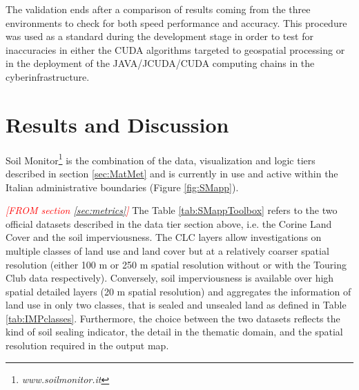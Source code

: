\documentclass[APA,LATO1COL,doublespace]{WileyNJD-v2}
\newcommand{\toberevised}[1]{\emph{\textcolor{red}{#1}}} %
\begin{document}
The validation ends after a comparison of results coming from the three environments to check for both speed performance and accuracy. 
This procedure was used as a standard during the development stage in order to test for inaccuracies in either the CUDA algorithms targeted to geospatial processing or in the deployment of the JAVA/JCUDA/CUDA computing chains in the cyberinfrastructure.

\section{ Results and Discussion } %
\label{sec:results}
Soil Monitor\footnote{\emph{www.soilmonitor.it}} is the combination of the data, visualization and logic tiers described in section \ref{sec:MatMet} and is currently in use and active within the Italian administrative boundaries (Figure \ref{fig:SMapp}).

\toberevised{[FROM section \ref{sec:metrics}]}
The Table \ref{tab:SMappToolbox} refers to the two official datasets described in the data tier section above, i.e. the Corine Land Cover and the soil imperviousness. 
The CLC layers allow investigations on multiple classes of land use and land cover but at a relatively coarser spatial resolution (either 100 m or 250 m spatial resolution without or with the Touring Club data respectively).
Conversely, soil imperviousness is available over high spatial detailed layers (20 m spatial resolution) and aggregates the information of land use in only two classes, that is sealed and unsealed land as defined in Table \ref{tab:IMPclasses}. 
Furthermore, the choice between the two datasets reflects the kind of soil sealing indicator, the detail in the thematic domain, and the spatial resolution required in the output map. 
\end{document}
